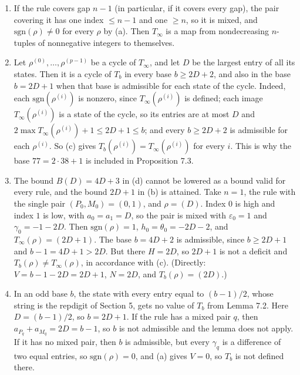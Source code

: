 \documentclass[11pt,letterpaper]{article}
\theoremstyle{paperstyle}
\theoremstyle{paperstyledef}
\theoremstyle{paperstylerem}
\begin{document}
\begin{enumerate}
\def\labelenumi{(\roman{enumi})}
\setcounter{enumi}{1}
\item
  If the rule covers gap \(n - 1\) (in particular, if it covers every gap), the pair covering it has one index \(\le n-1\) and one \(\ge n\), so it is mixed, and \(\mathrm{sgn}(\rho) \ne 0\) for every \(\rho\) by (a). Then \(T_\infty\) is a map from nondecreasing \(n\)-tuples of nonnegative integers to themselves.
\item
  Let \(\rho^{(0)}, \dots, \rho^{(p-1)}\) be a cycle of \(T_\infty\), and let \(D\) be the largest entry of all its states. Then it is a cycle of \(T_b\) in every base \(b \ge 2D + 2\), and also in the base \(b = 2D + 1\) when that base is admissible for each state of the cycle. Indeed, each \(\mathrm{sgn}(\rho^{(i)})\) is nonzero, since \(T_\infty(\rho^{(i)})\) is defined; each image \(T_\infty(\rho^{(i)})\) is a state of the cycle, so its entries are at most \(D\) and \(2\max T_\infty(\rho^{(i)}) + 1 \le 2D + 1 \le b\); and every \(b \ge 2D + 2\) is admissible for each \(\rho^{(i)}\). So (c) gives \(T_b(\rho^{(i)}) = T_\infty(\rho^{(i)})\) for every \(i\). This is why the base \(77 = 2 \cdot 38 + 1\) is included in Proposition 7.3.
\item
  The bound \(B(D) = 4D + 3\) in (d) cannot be lowered as a bound valid for every rule, and the bound \(2D + 1\) in (b) is attained. Take \(n = 1\), the rule with the single pair \((P_0, M_0) = (0, 1)\), and \(\rho = (D)\). Index \(0\) is high and index \(1\) is low, with \(a_0 = a_1 = D\), so the pair is mixed with \(\varepsilon_0 = 1\) and \(\gamma_0 = -1 - 2D\). Then \(\mathrm{sgn}(\rho) = 1\), \(h_0 = \theta_0 = -2D - 2\), and \(T_\infty(\rho) = (2D + 1)\). The base \(b = 4D + 2\) is admissible, since \(b \ge 2D + 1\) and \(b - 1 = 4D + 1 > 2D\). But there \(H = 2D\), so \(2D + 1\) is not a deficit and \(T_b(\rho) \ne T_\infty(\rho)\), in accordance with (c). (Directly: \(V = b - 1 - 2D = 2D + 1\), \(N = 2D\), and \(T_b(\rho) = (2D)\).)
\item
  In an odd base \(b\), the state with every entry equal to \((b-1)/2\), whose string is the repdigit of Section 5, gets no value of \(T_b\) from Lemma 7.2. Here \(D = (b-1)/2\), so \(b = 2D + 1\). If the rule has a mixed pair \(q\), then \(a_{P_q} + a_{M_q} = 2D = b - 1\), so \(b\) is not admissible and the lemma does not apply. If it has no mixed pair, then \(b\) is admissible, but every \(\gamma_q\) is a difference of two equal entries, so \(\mathrm{sgn}(\rho) = 0\), and (a) gives \(V = 0\), so \(T_b\) is not defined there.
\end{enumerate}
\end{document}
